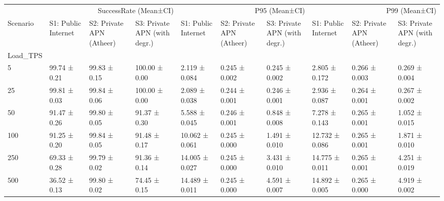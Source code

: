 \begin{tabular}{llllllllll}
\toprule
 & \multicolumn{3}{r}{SuccessRate (Mean±CI)} & \multicolumn{3}{r}{P95 (Mean±CI)} & \multicolumn{3}{r}{P99 (Mean±CI)} \\
Scenario & S1: Public Internet & S2: Private APN (Atheer) & S3: Private APN (with degr.) & S1: Public Internet & S2: Private APN (Atheer) & S3: Private APN (with degr.) & S1: Public Internet & S2: Private APN (Atheer) & S3: Private APN (with degr.) \\
Load_TPS &  &  &  &  &  &  &  &  &  \\
\midrule
5 & 99.74 ± 0.21 & 99.83 ± 0.15 & 100.00 ± 0.00 & 2.119 ± 0.084 & 0.245 ± 0.002 & 0.245 ± 0.002 & 2.805 ± 0.172 & 0.266 ± 0.003 & 0.269 ± 0.004 \\
25 & 99.81 ± 0.03 & 99.84 ± 0.06 & 100.00 ± 0.00 & 2.089 ± 0.038 & 0.244 ± 0.001 & 0.246 ± 0.001 & 2.936 ± 0.087 & 0.264 ± 0.001 & 0.267 ± 0.002 \\
50 & 91.47 ± 0.26 & 99.80 ± 0.05 & 91.37 ± 0.30 & 5.588 ± 0.045 & 0.246 ± 0.001 & 0.848 ± 0.008 & 7.278 ± 0.143 & 0.265 ± 0.001 & 1.052 ± 0.015 \\
100 & 91.25 ± 0.20 & 99.84 ± 0.05 & 91.48 ± 0.17 & 10.062 ± 0.061 & 0.245 ± 0.000 & 1.491 ± 0.010 & 12.732 ± 0.086 & 0.265 ± 0.001 & 1.871 ± 0.010 \\
250 & 69.33 ± 0.28 & 99.79 ± 0.02 & 91.36 ± 0.14 & 14.005 ± 0.027 & 0.245 ± 0.000 & 3.431 ± 0.010 & 14.775 ± 0.011 & 0.265 ± 0.001 & 4.251 ± 0.019 \\
500 & 36.52 ± 0.13 & 99.80 ± 0.02 & 74.45 ± 0.15 & 14.489 ± 0.011 & 0.245 ± 0.000 & 4.591 ± 0.007 & 14.892 ± 0.005 & 0.265 ± 0.000 & 4.919 ± 0.002 \\
\bottomrule
\end{tabular}
